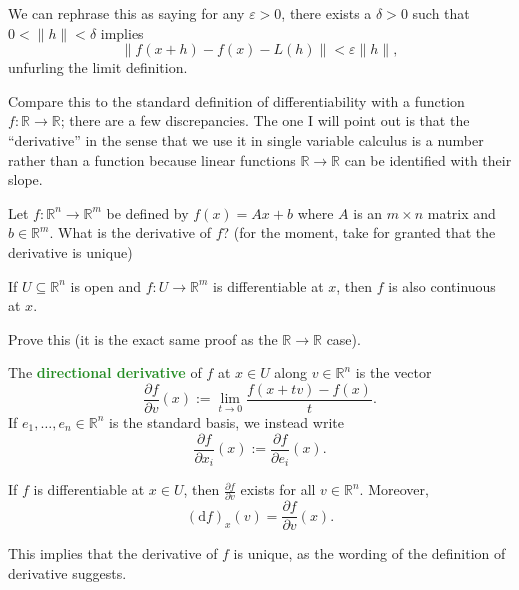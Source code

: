 \documentclass[10pt]{scrartcl}
\providecommand{\eps}{\varepsilon}
\providecommand{\RR}{\mathbb R}
\providecommand{\vocab}[1]{{\textbf{\textcolor{ForestGreen}{#1}}}}
\begin{document}
\begin{remark}
	We can rephrase this as saying
	for any $\eps > 0$, there exists a $\delta > 0$ such that
	$0 < \|h\| < \delta$ implies
	\[\|f(x + h) - f(x) - L(h)\| < \eps\|h\|,\]
	unfurling the limit definition.
\end{remark}

Compare this to the standard definition of differentiability
with a function $f\colon\RR\to\RR$; there are a few discrepancies.
The one I will point out is that the ``derivative''
in the sense that we use it in single variable calculus
is a number rather than a function because linear functions $\RR\to\RR$
can be identified with their slope.

\begin{exercise}
	Let $f\colon\RR^n\to\RR^m$ be defined by $f(x) = Ax + b$
	where $A$ is an $m\times n$ matrix and $b\in\RR^m$.
	What is the derivative of $f$?
	(for the moment, take for granted that the derivative is unique)
\end{exercise}

\begin{prop}
	If $U\subseteq\RR^n$ is open and $f\colon U\to\RR^m$ is differentiable
	at $x$, then $f$ is also continuous at $x$.
\end{prop}

\begin{exercise}
	Prove this (it is the exact same proof as the $\RR\to\RR$ case).
\end{exercise}

\begin{definition}
	The \vocab{directional derivative} of $f$ at $x\in U$ along
	$v\in\RR^n$ is the vector
	\[\frac{\partial f}{\partial v}(x) :=
	\lim_{t\to0} \frac{f(x + tv) - f(x)}{t}.\]
	If $e_1,\dots,e_n\in\RR^n$ is the standard basis,
	we instead write
	\[\frac{\partial f}{\partial x_i}(x) :=
	\frac{\partial f}{\partial e_i}(x).\]
\end{definition}

\begin{prop}
	If $f$ is differentiable at $x\in U$, then $\frac{\partial f}{\partial v}$
	exists for all $v\in\RR^n$. Moreover,
	\[(\mathrm df)_x(v) = \frac{\partial f}{\partial v}(x).\]
\end{prop}

\begin{remark}
	This implies that the derivative of $f$ is unique,
	as the wording of the definition of derivative suggests.
\end{remark}
\end{document}
